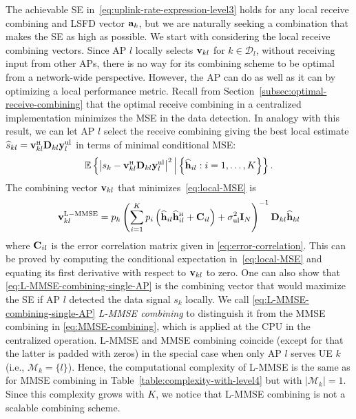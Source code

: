 The achievable SE in~\eqref{eq:uplink-rate-expression-level3} holds for any local receive combining and LSFD vector $\mathbf{a}_{k}$, but we are naturally seeking a combination that makes the SE as high as possible.
We start with considering the local receive combining vectors. Since AP $l$ locally selects $\mathbf{v}_{kl}$ for $k \in \mathcal{D}_l$, without receiving input from other APs, there is no way for its combining scheme to be optimal from a network-wide perspective. However, the AP can do as well as it can by optimizing a local performance metric. Recall from Section~\ref{subsec:optimal-receive-combining} that the optimal receive combining in a centralized implementation minimizes the MSE in the data detection. In analogy with this result, we can let AP $l$ select the receive combining giving the best local estimate $\widehat s_{kl} = \vect{v}_{kl}^{\Htran} \vect{D}_{kl} {\bf y}_{l}^{\rm{ul}}$ in terms of minimal conditional MSE:
\begin{align}\label{eq:local-MSE}
\mathbb{E}\left \{ \left| s_{k} - \vect{v}_{kl}^{\Htran} \vect{D}_{kl}\vect{y}_{l}^{\rm ul} \right|^2  \Big| \left\{ \widehat{\vect{h}}_{il} : i=1,\ldots,K  \right\} \right\}.
\end{align}
The combining vector $\mathbf{v}_{kl}$ that minimizes~\eqref{eq:local-MSE} is
\begin{equation} \label{eq:L-MMSE-combining-single-AP}
\vect{v}_{kl}^{{\rm L-MMSE}} =  p_{k}  \left( \sum\limits_{i=1}^{K} p_{i} \left( \widehat{\vect{h}}_{il} \widehat{\vect{h}}_{il}^{\Htran} + \vect{C}_{il} \right) + \sigmaUL  \vect{I}_{N} \right)^{-1}   \vect{D}_{kl}  \widehat{\vect{h}}_{kl}
\end{equation}
where $\mathbf{C}_{il}$ is the error correlation matrix given in \eqref{eq:error-correlation}.
This can be proved by computing the conditional expectation in~\eqref{eq:local-MSE} and equating its first derivative with respect to $\mathbf{v}_{kl}$ to zero. One can also show that \eqref{eq:L-MMSE-combining-single-AP} is the combining vector that would maximize the SE if AP $l$ detected the data signal $s_{k}$ locally. 
We call \eqref{eq:L-MMSE-combining-single-AP} \emph{\gls{L-MMSE} combining} to distinguish it from the MMSE combining in \eqref{eq:MMSE-combining}, which is applied at the CPU in the centralized operation. L-MMSE and MMSE combining coincide (except for that the latter is padded with zeros) in the special case when only AP $l$ serves UE $k$ (i.e., $\mathcal{M}_k = \{ l \}$). Hence, the computational complexity of L-MMSE  is the same as for MMSE combining in Table~\ref{table:complexity-with-level4} but with $|\mathcal{M}_k|=1$. Since this complexity grows with $K$, we notice that L-MMSE combining is not a scalable combining scheme.


